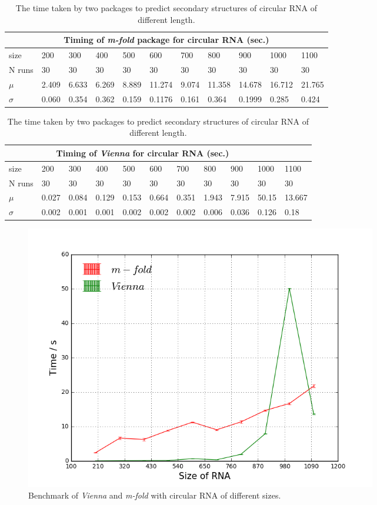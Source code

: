 \documentclass[12pt]{article}
\begin{document}
\begin{table}[H]
\begin{center}
    \begin{tabular}{ |p{1.5cm}||p{1.05cm}|p{1.05cm}|p{1.05cm}|p{1.05cm}|p{1.05cm}|p{1.05cm}|p{1.05cm}| p{1.05cm} | p{1.05cm} | p{1.05cm} |}
    \hline
    \multicolumn{11}{|c|}{Timing of \textit{m-fold} package for circular RNA (sec.)} \\
    \hline
    size& 200& 300& 400& 500& 600& 700 & 800 & 900 & 1000 & 1100\\
    \hline
    N runs& 30 & 30& 30 & 30& 30& 30& 30& 30& 30 & 30\\
    \hline
    $\mu$& 2.409 & 6.633 & 6.269 & 8.889 & 11.274 & 9.074 & 11.358 & 14.678 &16.712 & 21.765\\
    $\sigma$ & 0.060 & 0.354 & 0.362 & 0.159 & 0.1176 & 0.161 & 0.364 & 0.1999 & 0.285 & 0.424 \\
    \hline
    \end{tabular}
    \begin{tabular}{ |p{1.5cm}||p{1.05cm}|p{1.05cm}|p{1.05cm}|p{1.05cm}|p{1.05cm}|p{1.05cm}|p{1.05cm}| p{1.05cm} | p{1.05cm} | p{1.05cm} |}
    \hline
    \multicolumn{10}{|c|}{Timing of \textit{Vienna} for circular RNA (sec.)} \\
    \hline
    size& 200& 300& 400& 500& 600& 700 & 800 & 900 & 1000 & 1100\\
    \hline
    N runs& 30 & 30& 30 & 30& 30& 30& 30& 30& 30 & 30\\
    \hline
    $\mu$& 0.027 & 0.084 & 0.129 & 0.153 & 0.664 & 0.351 & 1.943 & 7.915 & 50.15 & 13.667 \\
    $\sigma$ & 0.002 & 0.001 & 0.001 & 0.002 & 0.002 & 0.002 & 0.006 & 0.036 & 0.126 & 0.18 \\
    \hline
    \end{tabular}
\caption{The time taken by two packages to predict secondary structures of circular RNA of different length.}
\end{center}
\end{table}
\begin{figure}[H]
    \centering
    \includegraphics[width=0.75\textwidth]{c-m-v.png}
    \caption{Benchmark of \textit{Vienna} and \textit{m-fold} with circular RNA of different sizes.}
    \label{fig:circular}
\end{figure}
\end{document}
